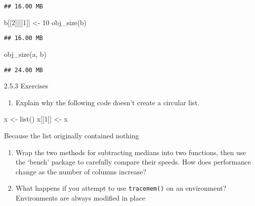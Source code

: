 \documentclass[
]{article}
\newenvironment{Shaded}{\begin{snugshade}}{\end{snugshade}}
\newcommand{\DecValTok}[1]{\textcolor[rgb]{0.00,0.00,0.81}{#1}}
\newcommand{\FunctionTok}[1]{\textcolor[rgb]{0.00,0.00,0.00}{#1}}
\newcommand{\NormalTok}[1]{#1}
\newcommand{\OtherTok}[1]{\textcolor[rgb]{0.56,0.35,0.01}{#1}}
\providecommand{\tightlist}{%
  \setlength{\itemsep}{0pt}\setlength{\parskip}{0pt}}
\begin{document}
\begin{verbatim}
## 16.00 MB
\end{verbatim}

\begin{Shaded}
\begin{Highlighting}[]
\NormalTok{b[[}\DecValTok{2}\NormalTok{]][[}\DecValTok{1}\NormalTok{]] }\OtherTok{\textless{}{-}} \DecValTok{10}
\FunctionTok{obj\_size}\NormalTok{(b)}
\end{Highlighting}
\end{Shaded}

\begin{verbatim}
## 16.00 MB
\end{verbatim}

\begin{Shaded}
\begin{Highlighting}[]
\FunctionTok{obj\_size}\NormalTok{(a, b)}
\end{Highlighting}
\end{Shaded}

\begin{verbatim}
## 24.00 MB
\end{verbatim}

2.5.3 Exercises

\begin{enumerate}
\def\labelenumi{\arabic{enumi}.}
\tightlist
\item
  Explain why the following code doesn't create a circular list.
\end{enumerate}

\begin{Shaded}
\begin{Highlighting}[]
\NormalTok{x }\OtherTok{\textless{}{-}} \FunctionTok{list}\NormalTok{()}
\NormalTok{x[[}\DecValTok{1}\NormalTok{]] }\OtherTok{\textless{}{-}}\NormalTok{ x}
\end{Highlighting}
\end{Shaded}

Because the list originally contained nothing

\begin{enumerate}
\def\labelenumi{\arabic{enumi}.}
\setcounter{enumi}{1}
\item
  Wrap the two methods for subtracting medians into two functions, then
  use the `bench' package to carefully compare their speeds. How does
  performance change as the number of columns increase?
\item
  What happens if you attempt to use \texttt{tracemem()} on an
  environment? Environments are always modified in place
\end{enumerate}
\end{document}
